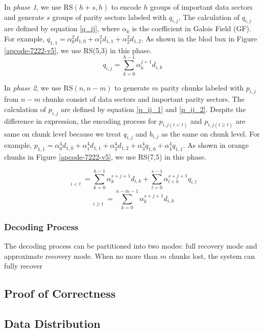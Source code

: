 \documentclass[sigconf]{acmart}
\begin{document}
In \emph{phase 1}, we use RS$(h+s,h)$ to encode $h$ groups of important data sectors and generate $s$ groups of parity sectors labeled with $q_{i,j}$. The calculation of $q_{i,j}$ are defined by equation \ref{q_ij}, where $\alpha_k$ is the coefficient in Galois Field (GF).
For example, $q_{1,1} = \alpha_0^2 d_{1,0} + \alpha_1^2 d_{1,1} + \alpha_2^2 d_{1,2}$.
As shown in the blod box in Figure \ref{apcode-7222-v5}, we use RS(5,3) in this phase.
\begin{equation}\label{q_ij}
    q_{i,j} = \sum_{k=0}^{h-1} \alpha_k^{j+1} d_{i,k}
\end{equation}

In \emph{phase 2}, we use RS$(n,n-m)$ to generate $m$ parity chunks labeled with $p_{i,j}$ from $n-m$ chunks consist of data sectors and important parity sectors. The calculation of $p_{i,j}$ are defined by equation \ref{p_ij_1} and \ref{p_ij_2}.
Despite the difference in expression, the encoding process for $p_{i,j(i<t)}$ and $p_{i,j(i \geqslant t)}$ are same on chunk level because we treat $q_{i,j}$ and $b_{i,j}$ as the same on chunk level.
For example, $p_{1,1} = \alpha_0^4 d_{1,0} + \alpha_1^4 d_{1,1} + \alpha_2^4 d_{1,2} + \alpha_3^4 q_{1,0} + \alpha_4^4 q_{1,1}$.
As shown in orange chunks in Figure \ref{apcode-7222-v5}, we use RS(7,5) in this phase.

\begin{equation}\label{p_ij_1}
    \mathop{p_{i,j}}\limits_{i<t} =
    \sum_{k=0}^{h-1} \alpha_k^{s+j+1} d_{i,k} +
    \sum_{l=0}^{s-1} \alpha_{l+h}^{s+j+1} q_{i,l}
\end{equation}
\begin{equation}\label{p_ij_2}
    \mathop{p_{i,j}}\limits_{i \geqslant t} =
    \sum_{k=0}^{n-m-1} \alpha_k^{s+j+1} d_{i,k}
\end{equation}

\subsubsection{Decoding Process}
The decoding process can be partitioned into two modes: full recovery mode and approximate recovery mode. When no more than $m$ chunks lost, the system can fully recover 


\subsection{Proof of Correctness}
\subsection{Data Distribution}\label{Data Distribution}
\end{document}

